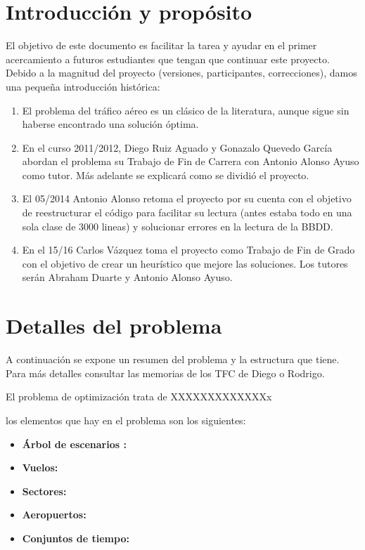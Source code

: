 \section{Introducción y propósito}
El objetivo de este documento es facilitar la tarea y ayudar en el primer acercamiento a futuros estudiantes que tengan que continuar este proyecto. \\

Debido a la magnitud del proyecto (versiones, participantes, correcciones), damos una pequeña introducción histórica:
\begin{enumerate}
\item El problema del tráfico aéreo es un clásico de la literatura, aunque sigue sin haberse encontrado una solución óptima.
\item En el curso 2011/2012, Diego Ruiz Aguado y Gonazalo Quevedo García abordan el problema su Trabajo de Fin de Carrera con Antonio Alonso Ayuso como tutor. Más adelante se explicará como se dividió el proyecto.
\item El 05/2014 Antonio Alonso retoma el proyecto por su cuenta con el objetivo de reestructurar el código para facilitar su lectura (antes estaba todo en una sola clase de 3000 lineas) y solucionar errores en la lectura de la BBDD.
\item En el 15/16 Carlos Vázquez toma el proyecto como Trabajo de Fin de Grado con el objetivo de crear un heurístico que mejore las soluciones. Los tutores serán Abraham Duarte y Antonio Alonso Ayuso.
\end{enumerate}

\section{Detalles del problema}
A continuación se expone un resumen del problema y la estructura que tiene. Para más detalles consultar las memorias de los TFC de Diego o Rodrigo.

El problema de optimización trata de XXXXXXXXXXXXXx

los elementos que hay en el problema son los siguientes:
\begin{itemize}
\item \textbf{Árbol de escenarios :} 
\item \textbf{Vuelos: }
\item \textbf{Sectores: }
\item \textbf{Aeropuertos: }
\item \textbf{Conjuntos de tiempo: }
\end{itemize}

